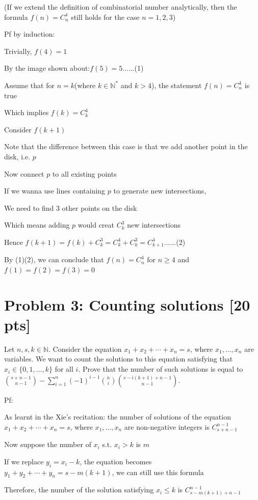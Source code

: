 \documentclass[11pt,twoside]{article}
\newcommand{\problem}[1]{\section*{Problem #1}}
\begin{document}
(If we extend the definition of combinatorial number analytically, then the formula $f(n) = C^4_n$ still holds for the case $n=1,2,3$)

\hspace*{\fill}

Pf by induction:

Trivially, $f(4) = 1$

By the image shown about:$f(5)=5$......(1)

Assume that for $n = k$(where $k \in \mathbb{N^*} $ and $k>4$), the statement $f(n) = C^4_n$ is true

Which implies $f(k) = C^4_k$

Consider $f(k+1)$

Note that the difference between this case is that we add another point in the disk, i.e. $p$

Now connect $p$ to all existing points

If we wanna use lines containing $p$ to generate new intersections,

We need to find 3 other points on the disk

Which means adding $p$ would creat $C^3_k $ new intersections

Hence $f(k+1) = f(k) + C^3_k = C^4_k+C^3_k = C^4_{k+1}$......(2)

By (1)(2), we can conclude that $f(n) = C^4_n$ for $n\geq 4$ and $f(1) =f(2) =f(3) =0$



\problem{3: Counting solutions [20 pts]}
Let $n,s,k \in \mathbb{N}$.
Consider the equation $x_1+x_2+\cdots+x_n = s$, where $x_1,\dots,x_n$ are variables.
We want to count the solutions to this equation satisfying that $x_i \in \{0,1,\dots,k\}$ for all $i$.
Prove that the number of such solutions is equal to $\binom{s+n-1}{n-1} - \sum_{i=1}^n (-1)^{i-1} \binom{n}{i} \binom{s-i(k+1)+n-1}{n-1}$.

\hspace*{\fill}

Pf:

As learnt in the Xie's recitation: the number of solutions of the equation $x_1+x_2+\cdots+x_n = s$, where $x_1,\dots,x_n$ are non-negative integers is $C^{n-1}_{s+n-1}$

Now suppose the number of $x_i$ s.t. $x_i > k $ is $m$

If we replace $y_i = x_i - k$, the equation becomes $y_1+y_2+\cdots+y_n = s-m(k+1)$, we can still use this formula

Therefore, the number of the solution satisfying $x_i \leq k$ is $C^{n-1}_{s-m(k+1)+n-1}$
\end{document}
